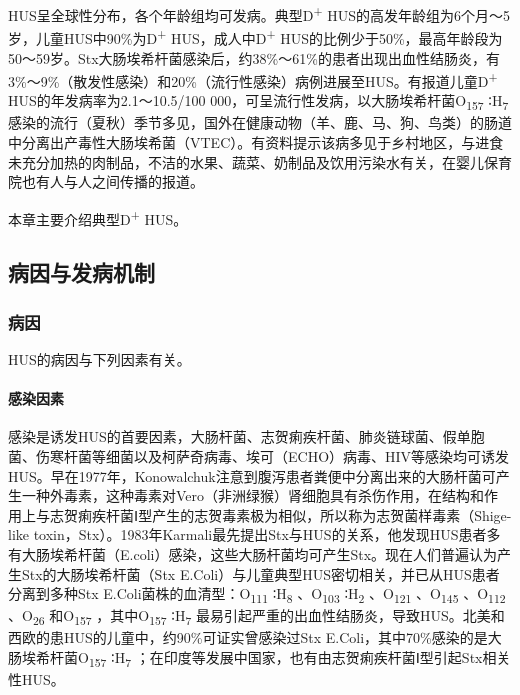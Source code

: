 HUS呈全球性分布，各个年龄组均可发病。典型D\textsuperscript{+}
HUS的高发年龄组为6个月～5岁，儿童HUS中90\%为D\textsuperscript{+}
HUS，成人中D\textsuperscript{+}
HUS的比例少于50\%，最高年龄段为50～59岁。Stx大肠埃希杆菌感染后，约38\%～61\%的患者出现出血性结肠炎，有3\%～9\%（散发性感染）和20\%（流行性感染）病例进展至HUS。有报道儿童D\textsuperscript{+}
HUS的年发病率为2.1～10.5/100
000，可呈流行性发病，以大肠埃希杆菌O\textsubscript{157}
∶H\textsubscript{7}
感染的流行（夏秋）季节多见，国外在健康动物（羊、鹿、马、狗、鸟类）的肠道中分离出产毒性大肠埃希菌（VTEC）。有资料提示该病多见于乡村地区，与进食未充分加热的肉制品，不洁的水果、蔬菜、奶制品及饮用污染水有关，在婴儿保育院也有人与人之间传播的报道。

本章主要介绍典型D\textsuperscript{+} HUS。

\subsection{病因与发病机制}

\subsubsection{病因}

HUS的病因与下列因素有关。

\paragraph{感染因素}

感染是诱发HUS的首要因素，大肠杆菌、志贺痢疾杆菌、肺炎链球菌、假单胞菌、伤寒杆菌等细菌以及柯萨奇病毒、埃可（ECHO）病毒、HIV等感染均可诱发HUS。早在1977年，Konowalchuk注意到腹泻患者粪便中分离出来的大肠杆菌可产生一种外毒素，这种毒素对Vero（非洲绿猴）肾细胞具有杀伤作用，在结构和作用上与志贺痢疾杆菌Ⅰ型产生的志贺毒素极为相似，所以称为志贺菌样毒素（Shige-like
toxin，Stx）。1983年Karmali最先提出Stx与HUS的关系，他发现HUS患者多有大肠埃希杆菌（E.coli）感染，这些大肠杆菌均可产生Stx。现在人们普遍认为产生Stx的大肠埃希杆菌（Stx
E.Coli）与儿童典型HUS密切相关，并已从HUS患者分离到多种Stx
E.Coli菌株的血清型：O\textsubscript{111} ∶H\textsubscript{8}
、O\textsubscript{103} ∶H\textsubscript{2} 、O\textsubscript{121}
、O\textsubscript{145} 、O\textsubscript{112} 、O\textsubscript{26}
和O\textsubscript{157} ，其中O\textsubscript{157} ∶H\textsubscript{7}
最易引起严重的出血性结肠炎，导致HUS。北美和西欧的患HUS的儿童中，约90\%可证实曾感染过Stx
E.Coli，其中70\%感染的是大肠埃希杆菌O\textsubscript{157}
∶H\textsubscript{7}
；在印度等发展中国家，也有由志贺痢疾杆菌Ⅰ型引起Stx相关性HUS。

